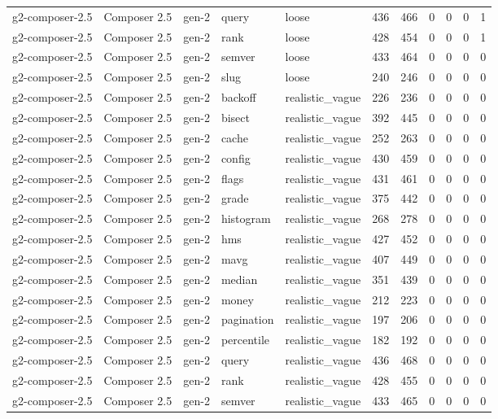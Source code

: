 \begin{tabular}{lllllllllll}
g2-composer-2.5 & Composer 2.5 & gen-2 & query & loose & 436 & 466 & 0 & 0 & 0 & 1 \\
g2-composer-2.5 & Composer 2.5 & gen-2 & rank & loose & 428 & 454 & 0 & 0 & 0 & 1 \\
g2-composer-2.5 & Composer 2.5 & gen-2 & semver & loose & 433 & 464 & 0 & 0 & 0 & 0 \\
g2-composer-2.5 & Composer 2.5 & gen-2 & slug & loose & 240 & 246 & 0 & 0 & 0 & 0 \\
g2-composer-2.5 & Composer 2.5 & gen-2 & backoff & realistic\_vague & 226 & 236 & 0 & 0 & 0 & 0 \\
g2-composer-2.5 & Composer 2.5 & gen-2 & bisect & realistic\_vague & 392 & 445 & 0 & 0 & 0 & 0 \\
g2-composer-2.5 & Composer 2.5 & gen-2 & cache & realistic\_vague & 252 & 263 & 0 & 0 & 0 & 0 \\
g2-composer-2.5 & Composer 2.5 & gen-2 & config & realistic\_vague & 430 & 459 & 0 & 0 & 0 & 0 \\
g2-composer-2.5 & Composer 2.5 & gen-2 & flags & realistic\_vague & 431 & 461 & 0 & 0 & 0 & 0 \\
g2-composer-2.5 & Composer 2.5 & gen-2 & grade & realistic\_vague & 375 & 442 & 0 & 0 & 0 & 0 \\
g2-composer-2.5 & Composer 2.5 & gen-2 & histogram & realistic\_vague & 268 & 278 & 0 & 0 & 0 & 0 \\
g2-composer-2.5 & Composer 2.5 & gen-2 & hms & realistic\_vague & 427 & 452 & 0 & 0 & 0 & 0 \\
g2-composer-2.5 & Composer 2.5 & gen-2 & mavg & realistic\_vague & 407 & 449 & 0 & 0 & 0 & 0 \\
g2-composer-2.5 & Composer 2.5 & gen-2 & median & realistic\_vague & 351 & 439 & 0 & 0 & 0 & 0 \\
g2-composer-2.5 & Composer 2.5 & gen-2 & money & realistic\_vague & 212 & 223 & 0 & 0 & 0 & 0 \\
g2-composer-2.5 & Composer 2.5 & gen-2 & pagination & realistic\_vague & 197 & 206 & 0 & 0 & 0 & 0 \\
g2-composer-2.5 & Composer 2.5 & gen-2 & percentile & realistic\_vague & 182 & 192 & 0 & 0 & 0 & 0 \\
g2-composer-2.5 & Composer 2.5 & gen-2 & query & realistic\_vague & 436 & 468 & 0 & 0 & 0 & 0 \\
g2-composer-2.5 & Composer 2.5 & gen-2 & rank & realistic\_vague & 428 & 455 & 0 & 0 & 0 & 0 \\
g2-composer-2.5 & Composer 2.5 & gen-2 & semver & realistic\_vague & 433 & 465 & 0 & 0 & 0 & 0 \\

\end{tabular}
